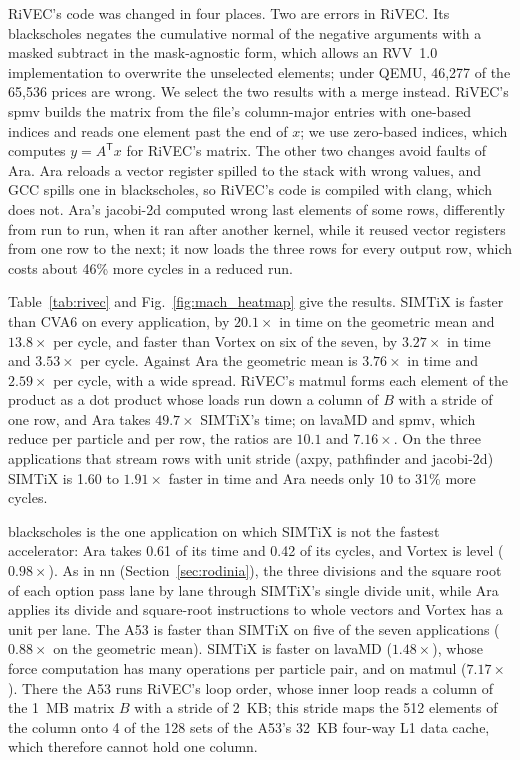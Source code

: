 \documentclass[journal]{IEEEtran}
\begin{document}
RiVEC's code was changed in four places. Two are errors in RiVEC. Its blackscholes
negates the cumulative normal of the negative arguments with a masked subtract in the
mask-agnostic form, which allows an RVV~1.0 implementation to overwrite the
unselected elements; under QEMU, 46,277 of the 65,536 prices are wrong. We select the
two results with a merge instead. RiVEC's spmv builds the matrix from the file's
column-major entries with one-based indices and reads one element past the end of $x$;
we use zero-based indices, which computes $y=A^{\mathsf T}x$ for RiVEC's matrix. The
other two changes avoid faults of Ara. Ara reloads a vector register spilled to the
stack with wrong values, and GCC spills one in blackscholes, so RiVEC's code is
compiled with clang, which does not. Ara's jacobi-2d computed wrong last elements of
some rows, differently from run to run, when it ran after another kernel, while it
reused vector registers from one row to the next; it now loads the three rows for
every output row, which costs about 46\% more cycles in a reduced run.

Table~\ref{tab:rivec} and Fig.~\ref{fig:mach_heatmap} give the results.
SIMTiX is faster than CVA6 on every application, by $20.1\times$ in time on the
geometric mean and $13.8\times$ per cycle, and faster than Vortex on six of the
seven, by $3.27\times$ in time and $3.53\times$ per cycle. Against Ara the geometric
mean is $3.76\times$ in time and $2.59\times$ per cycle, with a wide spread. RiVEC's
matmul forms each element of the product as a dot product whose loads run down a
column of $B$ with a stride of one row, and Ara takes $49.7\times$ SIMTiX's time; on
lavaMD and spmv, which reduce per particle and per row, the ratios are $10.1$ and
$7.16\times$. On the three applications that stream rows with unit stride (axpy,
pathfinder and jacobi-2d) SIMTiX is 1.60 to $1.91\times$ faster in time and Ara needs
only 10 to 31\% more cycles.

blackscholes is the one application on which SIMTiX is not the fastest accelerator:
Ara takes 0.61 of its time and 0.42 of its cycles, and Vortex is level
($0.98\times$). As in nn (Section~\ref{sec:rodinia}), the three divisions and the
square root of each option pass lane by lane through SIMTiX's single divide unit,
while Ara applies its divide and square-root instructions to whole vectors and Vortex
has a unit per lane. The A53 is faster than SIMTiX on five of the seven applications
($0.88\times$ on the geometric mean). SIMTiX is faster on lavaMD ($1.48\times$),
whose force computation has many operations per particle pair, and on matmul
($7.17\times$). There the A53 runs RiVEC's loop order, whose inner loop reads a column
of the 1~MB matrix $B$ with a stride of 2~KB; this stride maps the 512 elements of the
column onto 4 of the 128 sets of the A53's 32~KB four-way L1 data cache, which
therefore cannot hold one column.
\end{document}
